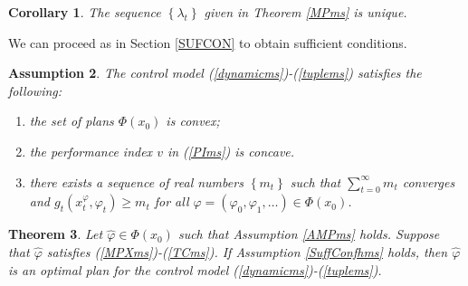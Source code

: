 \documentclass[3p]{elsarticle}
\newtheorem{thm}{Theorem}
\newtheorem{assu}[thm]{Assumption}
\newtheorem{cor}[thm]{Corollary}
\begin{document}
	
	\begin{cor}\label{muluniquems}
		The sequence $\left\lbrace \lambda_t\right\rbrace $ given in Theorem \ref{MPms} is unique.
	\end{cor}
	
	
	We can proceed as in Section \ref{SUFCON} to obtain sufficient conditions.
	\begin{assu}
		The control model (\ref{dynamicms})-(\ref{tuplems}) satisfies the following:
		\begin{enumerate}\label{SuffConfhms}
			\item[(a)]  the set of plans $\varPhi(x_0)$ is convex;	\item[(b)]	the performance index $v$ in  (\ref{PIms}) is concave.
			\item[(c)] there exists a sequence of real  numbers $\left\lbrace m_t\right\rbrace $ such that $\sum_{t=0}^\infty m_t$ converges and 
			$
			g_t(x_t^\varphi,\varphi_t)\ge m_t
			$ for all $\varphi=(\varphi_0,\varphi_1,\dots)\in\varPhi(x_0)$.
		\end{enumerate}
	\end{assu}
	
	
	
	
	\begin{thm}\label{SufThmfhms}
		Let $\hat{\varphi}\in\varPhi(x_0)$ such that Assumption \ref{AMPms} holds. Suppose that $\hat\varphi$ satisfies (\ref{MPXms})-(\ref{TCms}). If Assumption \ref{SuffConfhms} holds, then $\hat\varphi$ is an optimal plan for the control model (\ref{dynamicms})-(\ref{tuplems}).
	\end{thm}
	
	

	
	
	
	
	
	
	
	
	
	
	
	
	
	
	
	
	
	
	
	
	
	
	
	
	
	
	
	
	
	
	
	
	
	
	
	
	
	
	
	
\end{document}
